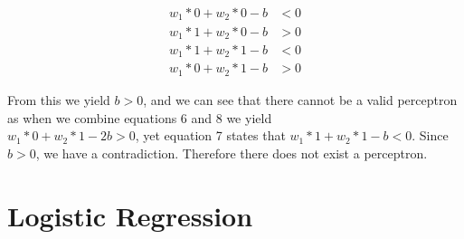 \documentclass[11pt]{article}
\begin{document}
\begin{enumerate}
{\begin{align}
w_1*0 + w_2*0 - b &< 0 \\
w_1*1 + w_2*0 - b &> 0 \\
w_1*1 + w_2*1 - b &< 0 \\
w_1*0 + w_2*1 - b &> 0
\end{align}

From this we yield $b > 0$, and we can see that there cannot be a valid perceptron as when we combine equations 6 and 8 we yield \\
$w_1*0 + w_2*1 - 2b > 0$, yet equation 7 states that $w_1*1 + w_2*1 - b < 0$. Since $b > 0$, we have a contradiction. Therefore there does not exist a perceptron.
}
\end{enumerate}
\newpage

\section{Logistic Regression}
\end{document}
